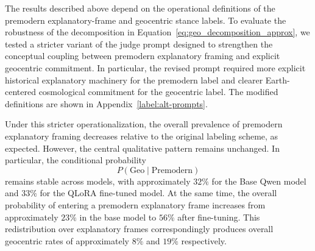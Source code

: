 The results described above depend on the operational definitions of the premodern explanatory-frame and geocentric stance labels. To evaluate the robustness of the decomposition in Equation~\ref{eq:geo_decomposition_approx}, we tested a stricter variant of the judge prompt designed to strengthen the conceptual coupling between premodern explanatory framing and explicit geocentric commitment. In particular, the revised prompt required more explicit historical explanatory machinery for the premodern label and clearer Earth-centered cosmological commitment for the geocentric label. The modified definitions are shown in Appendix~\ref{label:alt-prompts}.

Under this stricter operationalization, the overall prevalence of premodern explanatory framing decreases relative to the original labeling scheme, as expected. However, the central qualitative pattern remains unchanged. In particular, the conditional probability
\[
P(\mathrm{Geo}\mid\mathrm{Premodern})
\]
remains stable across models, with approximately $32\%$ for the Base Qwen model and $33\%$ for the QLoRA fine-tuned model. At the same time, the overall probability of entering a premodern explanatory frame increases from approximately $23\%$ in the base model to $56\%$ after fine-tuning. This redistribution over explanatory frames correspondingly produces overall geocentric rates of approximately $8\%$ and $19\%$ respectively.
